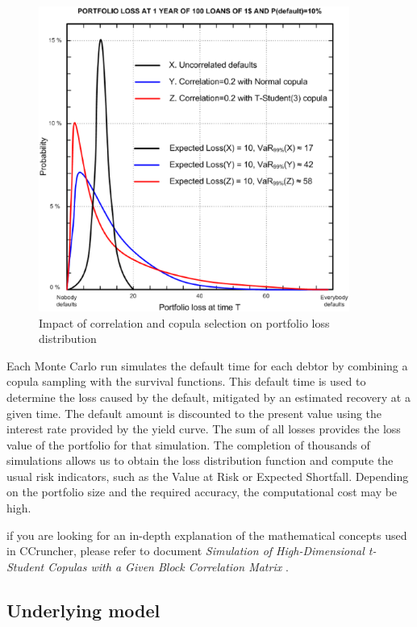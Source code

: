 \documentclass[a4paper,12pt,final]{article}
\begin{document}
\begin{figure}[!hbt]
\begin{center}
\includegraphics[height=10cm]{./images/ercim78.eps}
\caption{Impact of correlation and copula selection on portfolio loss distribution}
\label{correlation_impact}
\end{center}
\end{figure}
\FloatBarrier

Each Monte Carlo run simulates the default time for each debtor by combining a copula 
sampling with the survival functions. This default time is used to determine the loss 
caused by the default, mitigated by an estimated recovery at a given time. The default 
amount is discounted to the present value using the interest rate provided by the yield 
curve. The sum of all losses provides the loss value of the portfolio for that simulation. 
The completion of thousands of simulations allows us to obtain the loss distribution 
function and compute the usual risk indicators, such as the Value at Risk or Expected 
Shortfall. Depending on the portfolio size and the required accuracy, the computational 
cost may be high.
\newline

if you are looking for an in-depth explanation of the mathematical concepts used in CCruncher, 
please refer to document 
\emph{Simulation of High-Dimensional t-Student Copulas with a Given Block Correlation Matrix} 
\cite{ccruncher:astin}.

\subsection{Underlying model}
\label{model}
\end{document}
